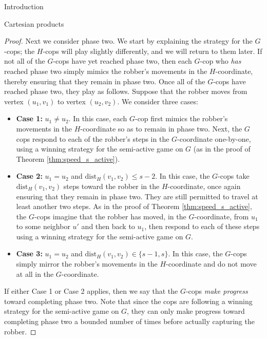 \documentclass[12pt]{amsart}
\theoremstyle{definition}
\begin{document}
\begin{section}{Introduction}
\begin{section}{Cartesian products}
\begin{proof}
Next we consider phase two.  We start by explaining the strategy for the $G$-cops; the $H$-cops will play slightly differently, and we will return to them later.  If not all of the $G$-cops have yet reached phase two, then each $G$-cop who \textit{has} reached phase two simply mimics the robber's movements in the $H$-coordinate, thereby ensuring that they remain in phase two.  Once all of the $G$-cops have reached phase two, they play as follows. Suppose that the robber moves from vertex $(u_1, v_1)$ to vertex $(u_2, v_2)$.  We consider three cases:
\begin{itemize}
\item \textbf{Case 1:} $u_1 \not = u_2$.  In this case, each $G$-cop first mimics the robber's movements in the $H$-coordinate so as to remain in phase two.  Next, the $G$ cops respond to each of the robber's steps in the $G$-coordinate one-by-one, using a winning strategy for the semi-active game on $G$ (as in the proof of Theorem \ref{thm:speed_s_active}).\\

\item \textbf{Case 2:} $u_1 = u_2$ and $\textrm{dist}_H(v_1, v_2) \le s-2$.  In this case, the $G$-cops take $\textrm{dist}_H(v_1, v_2)$ steps toward the robber in the $H$-coordinate, once again ensuring that they remain in phase two.  They are still permitted to travel at least another two steps.  As in the proof of Theorem \ref{thm:speed_s_active}, the $G$-cops imagine that the robber has moved, in the $G$-coordinate, from $u_1$ to some neighbor $u'$ and then back to $u_1$, then respond to each of these steps using a winning strategy for the semi-active game on $G$.\\

\item \textbf{Case 3:} $u_1 = u_2$ and $\textrm{dist}_H(v_1,v_2) \in \{s-1, s\}$.  In this case, the $G$-cops simply mirror the robber's movements in the $H$-coordinate and do not move at all in the $G$-coordinate.
\end{itemize}
If either Case 1 or Case 2 applies, then we say that the $G$-cops \textit{make progress} toward completing phase two.  Note that since the cops are following a winning strategy for the semi-active game on $G$, they can only make progress toward completing phase two a bounded number of times before actually capturing the robber.


\end{proof}
\end{section}
\end{section}
\end{document}
